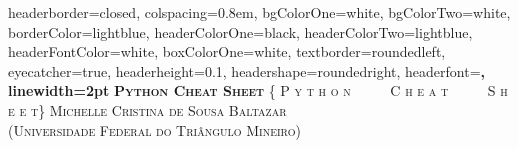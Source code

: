 \documentclass[landscape,a0paper,fontscale=0.285]{baposter} %
\begin{document}
				\begin{poster}
					{
						headerborder=closed, colspacing=0.8em, bgColorOne=white, bgColorTwo=white, borderColor=lightblue, headerColorOne=black, headerColorTwo=lightblue, 
						headerFontColor=white, boxColorOne=white, textborder=roundedleft, eyecatcher=true, headerheight=0.1\textheight, headershape=roundedright, headerfont=\Large\bf\textsc, linewidth=2pt 
					}
					{\bf\textsc{Python Cheat Sheet}\vspace{0.5em}} %
					{\textsc{\{ P y t h o n \ \ \ \ \ C h e a t \ \ \ \ \ S h e e t\} \hspace{12pt}}}
					{\textsc{Michelle Cristina de Sousa Baltazar \\ (Universidade Federal do Triângulo Mineiro) \hspace{12pt}}} 
					
\end{poster}
\end{document}

